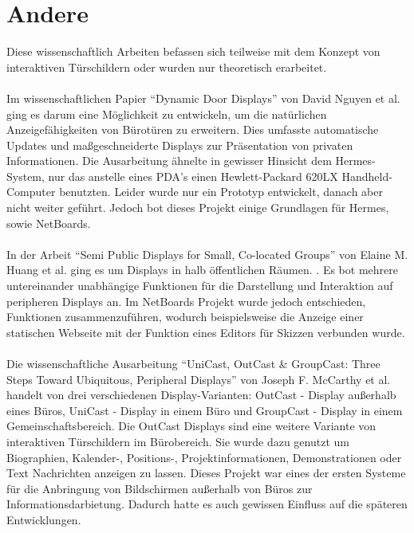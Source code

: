 \section{Andere}
Diese wissenschaftlich Arbeiten befassen sich teilweise mit dem Konzept von interaktiven Türschildern oder wurden nur theoretisch erarbeitet.
\\\\
Im wissenschaftlichen Papier ``Dynamic Door Displays'' von David Nguyen et al. ging es darum eine Möglichkeit zu entwickeln, um die natürlichen Anzeigefähigkeiten von Bürotüren zu erweitern. Dies umfasste automatische Updates und maßgeschneiderte Displays zur Präsentation von privaten Informationen\cite{nguyen:dyn-door-disp}. Die Ausarbeitung ähnelte in gewisser Hinsicht dem Hermes-System, nur das anstelle eines PDA's einen Hewlett-Packard 620LX Handheld-Computer benutzten.
Leider wurde nur ein Prototyp entwickelt, danach aber nicht weiter geführt. Jedoch bot dieses Projekt einige Grundlagen für Hermes, sowie NetBoards.\\\\
In der Arbeit ``Semi Public Displays for Small, Co-located Groups'' von Elaine M. Huang et al. ging es um Displays in halb öffentlichen Räumen. \cite{huang:2003}. Es bot mehrere untereinander unabhängige Funktionen für die Darstellung und Interaktion auf peripheren Displays an. Im NetBoards Projekt wurde jedoch entschieden, Funktionen zusammenzuführen, wodurch beispielsweise die Anzeige einer statischen Webseite mit der Funktion eines Editors für Skizzen verbunden wurde.\\\\
Die wissenschaftliche Ausarbeitung ``UniCast, OutCast \& GroupCast: Three Steps Toward Ubiquitous, Peripheral Displays'' von Joseph F. McCarthy et al. handelt von drei verschiedenen Display-Varianten: OutCast - Display außerhalb eines Büros, UniCast - Display in einem Büro und GroupCast - Display in einem Gemeinschaftsbereich\cite{mccarthy:2001}. Die OutCast Displays sind eine weitere Variante von interaktiven Türschildern im Bürobereich. Sie wurde dazu genutzt um Biographien, Kalender-, Positions-, Projektinformationen, Demonstrationen oder Text Nachrichten anzeigen zu lassen. Dieses Projekt war eines der ersten Systeme für die Anbringung von Bildschirmen außerhalb von Büros zur Informationsdarbietung. Dadurch hatte es auch gewissen Einfluss auf die späteren Entwicklungen.